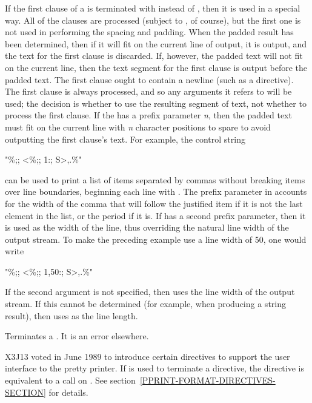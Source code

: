 \begin{flushdesc}
If the first clause of a \cd{{\Xtilde}<} is terminated with \cd{{\Xtilde}:;} instead of
\cd{{\Xtilde};}, then it is used in a special way.  All of the clauses are
processed (subject to \cd{{\Xtilde}{\Xcircumflex}}, of course), but the first one is not used
in performing the spacing and padding.  When the padded result has been
determined, then if it will fit on the current line of output, it is
output, and the text for the first clause is discarded.  If, however, the
padded text will not fit on the current line, then the text segment for
the first clause is output before the padded text.  The first clause
ought to contain a newline (such as a \cd{{\Xtilde}\%} directive).  The first
clause is always processed, and so any arguments it refers to will be
used; the decision is whether to use the resulting segment of text, not
whether to process the first clause.  If the \cd{{\Xtilde}:;} has a prefix
parameter \emph{n}, then the padded text must fit on the current line with
\emph{n} character positions to spare to avoid outputting the first clause's
text.  For example, the control string
\begin{lisp}
"{\Xtilde}\%;; {\Xtilde}{\Xlbrace}{\Xtilde}<{\Xtilde}\%;; {\Xtilde}1:; {\Xtilde}S{\Xtilde}>{\Xtilde}{\Xcircumflex},{\Xtilde}{\Xrbrace}.{\Xtilde}\%"
\end{lisp}
can be used to print a list of items separated by commas without
breaking items over line boundaries, beginning each line with
\cd{;; }.  The prefix parameter  in  accounts for the width of the
comma that will follow the justified item if it is not the last
element in the list, or the period if it is.  If \cd{{\Xtilde}:;} has a second
prefix parameter, then it is used as the width of the line,
thus overriding the natural line width of the output stream.  To make
the preceding example use a line width of 50, one would write
\begin{lisp}
"{\Xtilde}\%;; {\Xtilde}{\Xlbrace}{\Xtilde}<{\Xtilde}\%;; {\Xtilde}1,50:; {\Xtilde}S{\Xtilde}>{\Xtilde}{\Xcircumflex},{\Xtilde}{\Xrbrace}.{\Xtilde}\%"
\end{lisp}

If the second argument is not specified, then  uses the
line width of the output stream.
If this cannot be determined (for example, when producing a string result),
then  uses  as the line length.

\item[\cd{{\Xtilde}>}]
Terminates a \cd{{\Xtilde}<}.  It is an error elsewhere.
\begin{new}
X3J13 voted in June 1989  to introduce
certain  directives to support the user interface to the pretty
printer.  If \cd{{\Xtilde}:>} is used to terminate a
 directive, the directive is equivalent to a call on
.
See section~\ref{PPRINT-FORMAT-DIRECTIVES-SECTION} for details.
\end{new}


\end{flushdesc}
